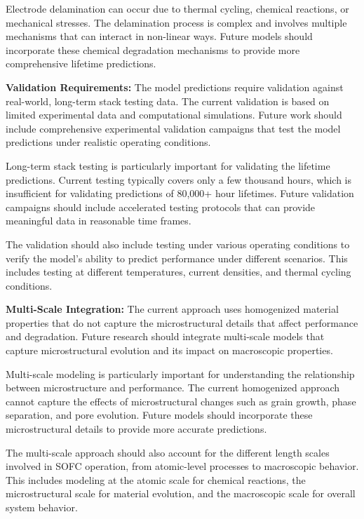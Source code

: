 \documentclass[conference]{IEEEtran}
\begin{document}
Electrode delamination can occur due to thermal cycling, chemical reactions, or mechanical stresses. The delamination process is complex and involves multiple mechanisms that can interact in non-linear ways. Future models should incorporate these chemical degradation mechanisms to provide more comprehensive lifetime predictions.

\textbf{Validation Requirements:} The model predictions require validation against real-world, long-term stack testing data. The current validation is based on limited experimental data and computational simulations. Future work should include comprehensive experimental validation campaigns that test the model predictions under realistic operating conditions.

Long-term stack testing is particularly important for validating the lifetime predictions. Current testing typically covers only a few thousand hours, which is insufficient for validating predictions of 80,000+ hour lifetimes. Future validation campaigns should include accelerated testing protocols that can provide meaningful data in reasonable time frames.

The validation should also include testing under various operating conditions to verify the model's ability to predict performance under different scenarios. This includes testing at different temperatures, current densities, and thermal cycling conditions.

\textbf{Multi-Scale Integration:} The current approach uses homogenized material properties that do not capture the microstructural details that affect performance and degradation. Future research should integrate multi-scale models that capture microstructural evolution and its impact on macroscopic properties.

Multi-scale modeling is particularly important for understanding the relationship between microstructure and performance. The current homogenized approach cannot capture the effects of microstructural changes such as grain growth, phase separation, and pore evolution. Future models should incorporate these microstructural details to provide more accurate predictions.

The multi-scale approach should also account for the different length scales involved in SOFC operation, from atomic-level processes to macroscopic behavior. This includes modeling at the atomic scale for chemical reactions, the microstructural scale for material evolution, and the macroscopic scale for overall system behavior.
\end{document}
